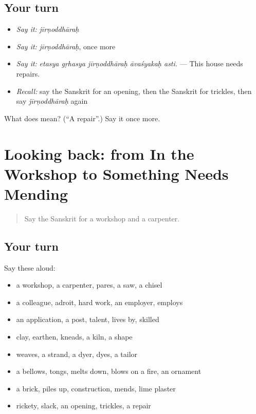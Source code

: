 \subsection*{Your turn}
\begin{itemize}
\raggedright
  \item \emph{Say it:} \emph{jīrṇoddhāraḥ}
  \item \emph{Say it:} \emph{jīrṇoddhāraḥ}, once more
  \item \emph{Say it:} \emph{etasya gṛhasya jīrṇoddhāraḥ āvaśyakaḥ asti.} — This house needs repairs.
  \item \emph{Recall:} say the Sanskrit for an opening, then the Sanskrit for trickles, then say \emph{jīrṇoddhāraḥ} again
\end{itemize}

\begin{tcolorbox}[breakable,colback=teal!4,colframe=teal!35!black,title={Before you move on}]
What does  mean? (\textquotedblleft{}A repair\textquotedblright{}.) Say it once more.
\end{tcolorbox}
\section[(dialogue)]{Looking back: from In the Workshop to Something Needs Mending}

\label{lesson:SA-R509-review-502-509}



\begin{quote}
Say the Sanskrit for a workshop and a carpenter.
\end{quote}

\subsection*{Your turn}
Say these aloud:

\begin{itemize}
\raggedright
  \item a workshop, a carpenter, pares, a saw, a chisel
  \item a colleague, adroit, hard work, an employer, employs
  \item an application, a post, talent, lives by, skilled
  \item clay, earthen, kneads, a kiln, a shape
  \item weaves, a strand, a dyer, dyes, a tailor
  \item a bellows, tongs, melts down, blows on a fire, an ornament
  \item a brick, piles up, construction, mends, lime plaster
  \item rickety, slack, an opening, trickles, a repair
\end{itemize}

